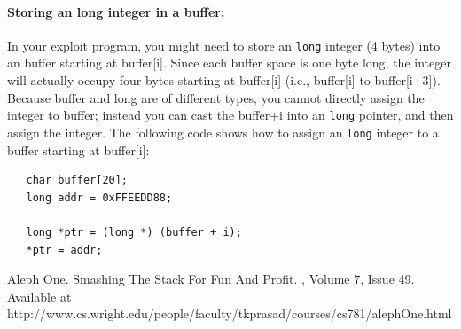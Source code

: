 \paragraph{Storing an long integer in a buffer:} 
In your exploit program, you might need to store an {\tt long} 
integer (4 bytes) into an buffer starting at buffer[i]. 
Since each buffer space is one byte long,
the integer will actually occupy four bytes starting at buffer[i] (i.e.,
buffer[i] to buffer[i+3]). Because buffer and long are of different
types, you cannot directly assign the integer to buffer; instead you can 
cast the buffer+i into an {\tt long} pointer, and then assign the integer. The
following code shows how to assign an {\tt long} integer to a buffer
starting at buffer[i]:
\begin{verbatim}
   char buffer[20];
   long addr = 0xFFEEDD88;

   long *ptr = (long *) (buffer + i);
   *ptr = addr;
\end{verbatim}

\begin{thebibliography}{10}

Aleph One.
\newblock Smashing The Stack For Fun And Profit.
, Volume 7, Issue 49. Available at
         http://www.cs.wright.edu/people/faculty/tkprasad/courses/cs781/alephOne.html
\end{thebibliography}



